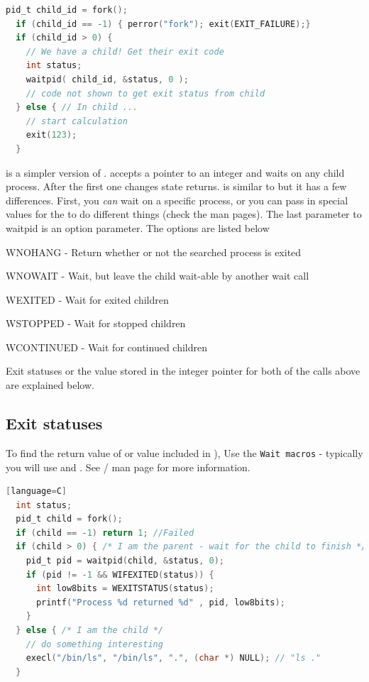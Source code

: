 \begin{itemize}
\begin{itemize}
\begin{lstlisting}[language=C]
  pid_t child_id = fork();
  if (child_id == -1) { perror("fork"); exit(EXIT_FAILURE);}
  if (child_id > 0) {
    // We have a child! Get their exit code
    int status;
    waitpid( child_id, &status, 0 );
    // code not shown to get exit status from child
  } else { // In child ...
    // start calculation
    exit(123);
  }
\end{lstlisting}

 is a simpler version of .
 accepts a pointer to an integer and waits on any child process.
After the first one changes state  returns.
 is similar to  but it has a few differences.
First, you \textit{can} wait on a specific process, or you can pass in special values for the  to do different things (check the man pages).
The last parameter to waitpid is an option parameter.
The options are listed below


\begin{enunmerate}
\item WNOHANG - Return whether or not the searched process is exited
\item WNOWAIT - Wait, but leave the child wait-able by another wait call
\item WEXITED - Wait for exited children
\item WSTOPPED - Wait for stopped children
\item WCONTINUED - Wait for continued children
\end{enunmerate}

Exit statuses or the value stored in the integer pointer for both of the calls above are explained below.

\subsection{Exit statuses}

To find the return value of  or value included in ), Use the \texttt{Wait macros} - typically you will use  and  .
See / man page for more information.

\begin{lstlisting}[language=C][language=C]
  int status;
  pid_t child = fork();
  if (child == -1) return 1; //Failed
  if (child > 0) { /* I am the parent - wait for the child to finish */
    pid_t pid = waitpid(child, &status, 0);
    if (pid != -1 && WIFEXITED(status)) {
      int low8bits = WEXITSTATUS(status);
      printf("Process %d returned %d" , pid, low8bits);
    }
  } else { /* I am the child */
    // do something interesting
    execl("/bin/ls", "/bin/ls", ".", (char *) NULL); // "ls ."
  }
\end{lstlisting}


\end{itemize}
\end{itemize}
